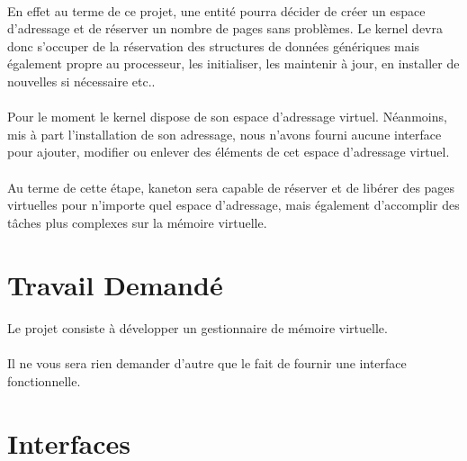 \documentclass[10pt,a4wide]{article}
\begin{document}
\paragraph{}

En effet au terme de ce projet, une entit\'e pourra d\'ecider de cr\'eer
un espace d'adressage et de r\'eserver un nombre de pages sans probl\`emes.
Le kernel devra donc s'occuper de la r\'eservation des structures de
donn\'ees g\'en\'eriques mais \'egalement propre au processeur, les
initialiser, les maintenir \`a jour, en installer de nouvelles si n\'ecessaire
etc..

\paragraph{}

Pour le moment le kernel dispose de son espace d'adressage virtuel.
N\'eanmoins, mis \`a part l'installation de son adressage, nous n'avons
fourni aucune interface pour ajouter, modifier ou enlever des \'el\'ements
de cet espace d'adressage virtuel.

\paragraph{}

Au terme de cette \'etape, kaneton sera capable de r\'eserver et
de lib\'erer des pages virtuelles pour n'importe quel espace d'adressage,
mais \'egalement d'accomplir des t\^aches plus complexes sur la
m\'emoire virtuelle.

\section{Travail Demand\'e}

\paragraph{}

Le projet consiste \`a d\'evelopper un gestionnaire de m\'emoire virtuelle.

\paragraph{}

Il ne vous sera rien demander d'autre que le fait de fournir une interface
fonctionnelle.

\section{Interfaces}
\end{document}

